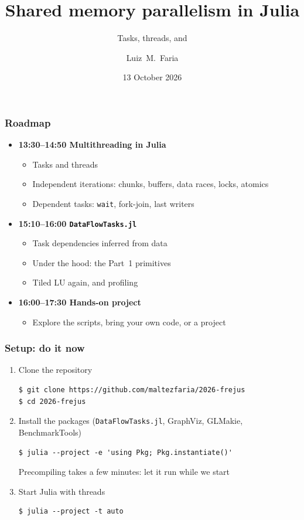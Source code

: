 \documentclass{beamer}
\title[Shared memory parallelism]
{Shared memory parallelism in Julia}
\subtitle{Tasks, threads, and \DFT}
\author{Luiz~M.~Faria}
\institute[POEMS]{ANF Julia4HPC, Fréjus}
\date{13 October 2026}
\newcommand{\DFT}{\texttt{DataFlowTasks.jl}}
\begin{document}
\begin{frame}[plain]
	\titlepage
\end{frame}


\begin{frame}
	\frametitle{Roadmap}
	\begin{itemize}
		\item \textbf{13:30--14:50 \textperiodcentered{} Multithreading in Julia}
		      \begin{itemize}
			      \item Tasks and threads
			      \item Independent iterations: chunks, buffers, data races, locks, atomics
			      \item Dependent tasks: \texttt{wait}, fork-join, last writers
		      \end{itemize}
		      \medskip
		\item \textbf{15:10--16:00 \textperiodcentered{} \DFT}
		      \begin{itemize}
			      \item Task dependencies inferred from data
			      \item Under the hood: the Part~1 primitives
			      \item Tiled LU again, and profiling
		      \end{itemize}
		      \medskip
		\item \textbf{16:00--17:30 \textperiodcentered{} Hands-on project}
		      \begin{itemize}
			      \item Explore the scripts, bring your own code, or a project
		      \end{itemize}
	\end{itemize}
\end{frame}

\begin{frame}[fragile]
	\frametitle{Setup: do it now}
	\begin{enumerate}
		\item Clone the repository
		      \begin{verbatim}
$ git clone https://github.com/maltezfaria/2026-frejus
$ cd 2026-frejus
		      \end{verbatim}
		\item Install the packages (\DFT, GraphViz, GLMakie, BenchmarkTools)
		      \begin{verbatim}
$ julia --project -e 'using Pkg; Pkg.instantiate()'
		      \end{verbatim}
			      {\small Precompiling takes a few minutes: let it run while we start}
		\item Start Julia with threads
		      \begin{verbatim}
$ julia --project -t auto
		      \end{verbatim}
	\end{enumerate}

	\vfill
\end{frame}
\end{document}
